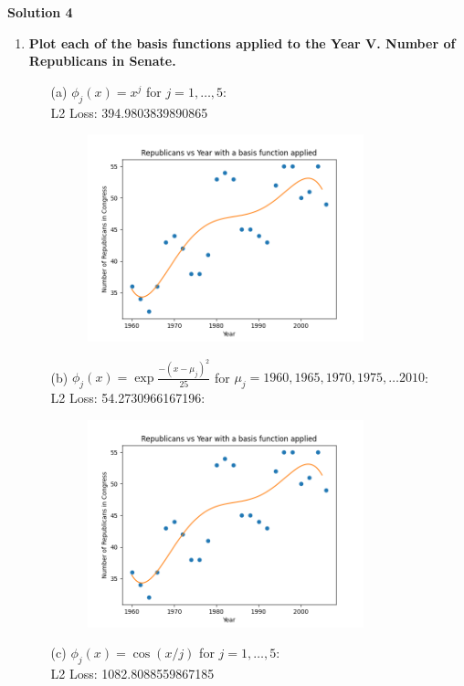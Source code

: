 \documentclass[submit]{harvardml}
\begin{document}
\newpage

\textbf{Solution 4}
\begin{enumerate}
    \item \textbf{Plot each of the basis functions applied to the Year V. Number of Republicans in Senate.}
    \begin{enumerate}
    	\item[(a)] $\phi_j(x) = x^j$ for $j=1, \ldots, 5$:\\
    	L2 Loss:  394.9803839890865 \\
    	\begin{figure}[H]
            \includegraphics[width=8cm]{hw1/T1P4_plots/plot0.png}
            \centering
        \end{figure}
        \item[(b)] $\phi_j(x) = \exp{\frac{-(x-\mu_j)^2}{25}}$ for $\mu_j=1960, 1965, 1970, 1975, \ldots 2010$: \\
        L2 Loss:  54.2730966167196:\\
        \begin{figure}[H]
            \includegraphics[width=8cm]{hw1/T1P4_plots/plot1.png}
            \centering
        \end{figure}
    	\item[(c)] $\phi_j(x) = \cos(x / j)$ for $j=1, \ldots, 5$: \\
    	L2 Loss:  1082.8088559867185 \\

\end{enumerate}
\end{enumerate}
\end{document}
